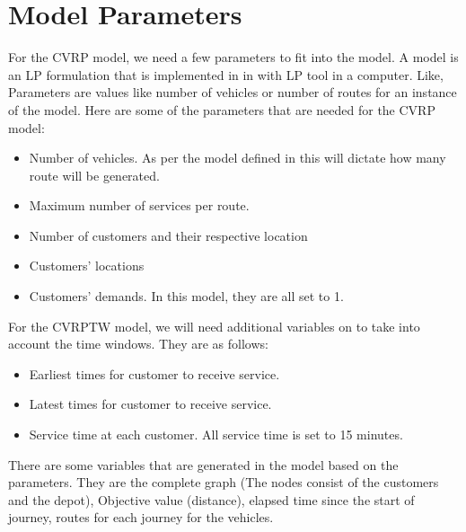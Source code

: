 \section{Model Parameters}
For the CVRP model, we need a few parameters to fit into the model. A model is an LP formulation that is implemented in
in with LP tool in a computer. Like,  Parameters are values like number of vehicles or number of routes for an instance of the model.
Here are some of the parameters that are needed for the CVRP model:
\begin{itemize}
\item Number of vehicles. As per the model defined in this will dictate how many route will be generated.
\item Maximum number of services per route.
\item Number of customers and their respective location
\item Customers' locations
\item Customers' demands. In this model, they are all set to 1.
\end{itemize}

For the CVRPTW model, we will need additional variables on to take into account the time windows. They are as follows:
\begin{itemize}
\item Earliest times for customer to receive service.
\item Latest times for customer to receive service.
\item Service time at each customer. All service time is set to 15 minutes.
\end{itemize}

There are some variables that are generated in the model based on the parameters. They are the complete graph
(The nodes consist of the customers and the depot), Objective value (distance), elapsed time since the start of journey,
routes for each journey for the vehicles.

